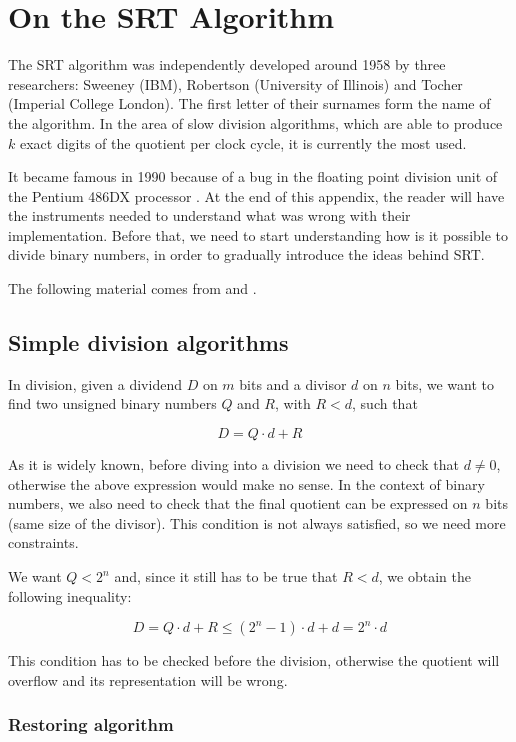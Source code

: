 \chapter{On the SRT Algorithm}\label{Chapter_SRT}

The SRT algorithm was independently developed around 1958 by three researchers: Sweeney (IBM), Robertson (University of Illinois) and Tocher (Imperial College London).
The first letter of their surnames form the name of the algorithm.
In the area of slow division algorithms, which are able to produce $k$ exact digits of the quotient per clock cycle, it is currently the most used. 

It became famous in 1990 because of a bug in the floating point division unit of the Pentium 486DX processor .
At the end of this appendix, the reader will have the instruments needed to understand what was wrong with their implementation.
Before that, we need to start understanding how is it possible to divide binary numbers, in order to gradually introduce the ideas behind SRT.

The following material comes from \cite{ruiz2021arithmetic} and \cite{parhami2010computer}. 

\section{Simple division algorithms}

In division, given a dividend $D$ on $m$ bits and a divisor $d$ on $n$ bits, we want to find two unsigned binary numbers $Q$ and $R$, with $R < d$, such that 

\[
    D = Q \cdot d + R
\]

As it is widely known, before diving into a division we need to check that $d \neq 0$, otherwise the above expression would make no sense.
In the context of binary numbers, we also need to check that the final quotient can be expressed on $n$ bits (same size of the divisor). 
This condition is not always satisfied, so we need more constraints.

We want $Q < 2^n$ and, since it still has to be true that $R < d$, we obtain the following inequality:

\[
    D = Q \cdot d + R \leq (2^n - 1) \cdot d + d = 2^n \cdot d
\]

This condition has to be checked before the division, otherwise the quotient will overflow and its representation will be wrong. 

\subsection{Restoring algorithm}

